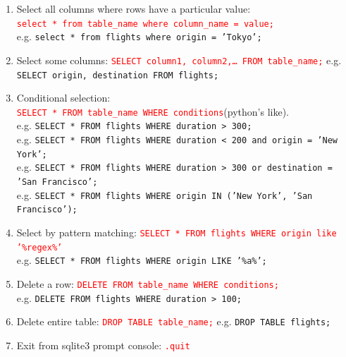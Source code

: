 \documentclass[12 pt, letterpaper]{extarticle}
\newcommand{\R}{\textcolor{red}} %
\newcommand{\T}{\texttt}
\begin{document}
\begin{enumerate}
		\item Select all columns where rows have a particular value:\\
			\R{\T{select * from table\_name where column\_name = value;}}\\
			e.g. \textcolor{red!70}{\T{select * from flights where origin = 'Tokyo';}}
		\item Select some columns: \R{\T{SELECT column1, column2,\dots\hspace{0.1cm} FROM table\_name;}}
			e.g. \textcolor{red!70}{\T{SELECT origin, destination FROM flights;}}
		\item Conditional selection:\\
			\R{\T{SELECT * FROM table\_name WHERE conditions}}(python's like).\\
			e.g. \textcolor{red!70}{\T{SELECT * FROM flights WHERE duration > 300;}}\\
			e.g. \textcolor{red!70}{\T{SELECT * FROM flights WHERE duration < 200 and origin = 'New York';}}\\
			e.g. \textcolor{red!70}{\T{SELECT * FROM flights WHERE duration > 300 or destination = 'San Francisco';}}\\
			e.g. \textcolor{red!70}{\T{SELECT * FROM flights WHERE origin IN ('New York', 'San Francisco');}}
		\item Select by pattern matching: \R{\T{SELECT * FROM flights WHERE origin like '\%regex\%'}}\\
			e.g. \textcolor{red!70}{\T{SELECT * FROM flights WHERE origin LIKE '\%a\%';}}
		\item Delete a row: \R{\T{DELETE FROM table\_name WHERE conditions;}}\\
			e.g. \textcolor{red!70}{\T{DELETE FROM flights WHERE duration > 100;}}
		\item Delete entire table: \R{\T{DROP TABLE table\_name;}}
			e.g. \textcolor{red!70}{\T{DROP TABLE flights;}}
		\item Exit from sqlite3 prompt console: \R{\T{.quit}}
	\end{enumerate}
\end{document}
